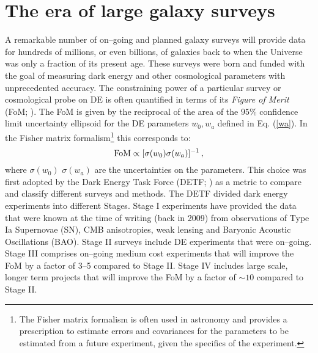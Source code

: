
\section{The era of large galaxy surveys}\label{sec:surveys}

A remarkable number of on--going and planned galaxy surveys will provide data for hundreds of millions, or even billions, of galaxies back to when the Universe was only a fraction of its present age. These surveys were born and funded with the goal of measuring dark energy and other cosmological parameters with unprecedented accuracy.
The constraining power of a particular survey or cosmological probe on DE is often quantified in terms of its \emph{Figure of Merit} (FoM; \citealt{huterer}). The FoM is given by the reciprocal of the area of the $95\%$ confidence limit uncertainty ellipsoid for the DE parameters $w_0,w_a$ defined in Eq. (\ref{wa}). In the Fisher matrix formalism\footnote{The Fisher matrix formalism is often used in astronomy and provides a prescription to estimate errors and covariances for the parameters to be estimated from a future experiment, given the specifics of the experiment.} this corresponds to:
\begin{equation}
{\rm FoM} \propto [\sigma(w_0)\sigma(w_a)]^{-1}\, ,
\end{equation}
where $\sigma(w_0)$ $\sigma(w_a)$ are the uncertainties on the parameters.
This choice was first adopted by the Dark Energy Task Force (DETF; \citealt{detf}) as a metric to compare and classify different surveys and methods. 
The DETF divided dark energy experiments into different Stages. Stage I experiments have provided the data that were known at the time of writing (back in 2009) from observations of Type Ia Supernovae (SN), CMB anisotropies, weak lensing and Baryonic Acoustic Oscillations (BAO). Stage II surveys include DE experiments that were on--going. Stage III comprises on--going medium cost experiments that will improve the FoM by a factor of 3--5 compared to Stage II. Stage IV includes large scale, longer term projects that will improve the FoM by a factor of $\sim 10$ compared to Stage II.

